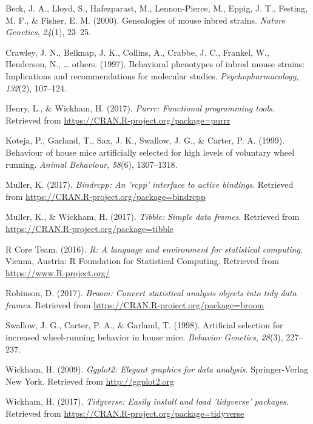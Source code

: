 \documentclass[english,man]{apa6}
\theoremstyle{definition}
\theoremstyle{definition}
\theoremstyle{definition}
\theoremstyle{remark}
\begin{document}
\hypertarget{ref-beck2000genealogies}{}
Beck, J. A., Lloyd, S., Hafezparast, M., Lennon-Pierce, M., Eppig, J.
T., Festing, M. F., \& Fisher, E. M. (2000). Genealogies of mouse inbred
strains. \emph{Nature Genetics}, \emph{24}(1), 23--25.

\hypertarget{ref-crawley1997behavioral}{}
Crawley, J. N., Belknap, J. K., Collins, A., Crabbe, J. C., Frankel, W.,
Henderson, N., \ldots{} others. (1997). Behavioral phenotypes of inbred
mouse strains: Implications and recommendations for molecular studies.
\emph{Psychopharmacology}, \emph{132}(2), 107--124.

\hypertarget{ref-R-purrr}{}
Henry, L., \& Wickham, H. (2017). \emph{Purrr: Functional programming
tools}. Retrieved from \url{https://CRAN.R-project.org/package=purrr}

\hypertarget{ref-koteja1999behaviour}{}
Koteja, P., Garland, T., Sax, J. K., Swallow, J. G., \& Carter, P. A.
(1999). Behaviour of house mice artificially selected for high levels of
voluntary wheel running. \emph{Animal Behaviour}, \emph{58}(6),
1307--1318.

\hypertarget{ref-R-bindrcpp}{}
Muller, K. (2017). \emph{Bindrcpp: An 'rcpp' interface to active
bindings}. Retrieved from
\url{https://CRAN.R-project.org/package=bindrcpp}

\hypertarget{ref-R-tibble}{}
Muller, K., \& Wickham, H. (2017). \emph{Tibble: Simple data frames}.
Retrieved from \url{https://CRAN.R-project.org/package=tibble}

\hypertarget{ref-R-base}{}
R Core Team. (2016). \emph{R: A language and environment for statistical
computing}. Vienna, Austria: R Foundation for Statistical Computing.
Retrieved from \url{https://www.R-project.org/}

\hypertarget{ref-R-broom}{}
Robinson, D. (2017). \emph{Broom: Convert statistical analysis objects
into tidy data frames}. Retrieved from
\url{https://CRAN.R-project.org/package=broom}

\hypertarget{ref-swallow1998artificial}{}
Swallow, J. G., Carter, P. A., \& Garland, T. (1998). Artificial
selection for increased wheel-running behavior in house mice.
\emph{Behavior Genetics}, \emph{28}(3), 227--237.

\hypertarget{ref-R-ggplot2}{}
Wickham, H. (2009). \emph{Ggplot2: Elegant graphics for data analysis}.
Springer-Verlag New York. Retrieved from \url{http://ggplot2.org}

\hypertarget{ref-R-tidyverse}{}
Wickham, H. (2017). \emph{Tidyverse: Easily install and load 'tidyverse'
packages}. Retrieved from
\url{https://CRAN.R-project.org/package=tidyverse}
\end{document}
